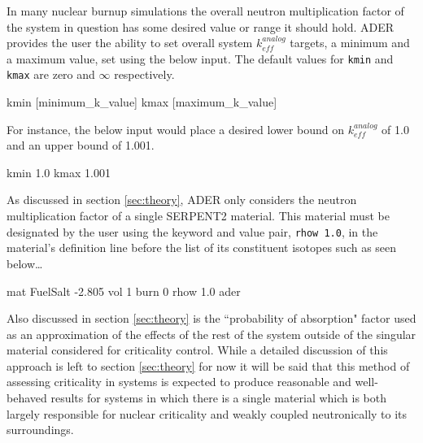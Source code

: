 In many nuclear burnup simulations the overall neutron multiplication factor
of the system in question has some desired value or range it should hold. 
ADER provides the user the ability to set overall system $k_{eff}^{analog}$
targets, a minimum and a maximum value, set using the below input. The default
values for \texttt{kmin} and \texttt{kmax} are zero and $\infty$ respectively.

\begin{lt}
kmin [minimum_k_value]
kmax [maximum_k_value]
\end{lt}

For instance, the below input would place a desired lower bound on
$k_{eff}^{analog}$ of 1.0 and an upper bound of 1.001.

\begin{li}
kmin 1.0
kmax 1.001
\end{li}

As discussed in section \ref{sec:theory}, ADER only considers the neutron
multiplication factor of a single SERPENT2 material. This material must be
designated by the user using the keyword and value pair, \texttt{rhow 1.0},
in the material's definition line before the list of its constituent isotopes
such as seen below\ldots

\begin{li}
mat FuelSalt -2.805 vol 1 burn 0 rhow 1.0 ader
\end{li}

Also discussed in section \ref{sec:theory} is the ``probability of absorption"
factor used as an approximation of the effects of the rest of the system outside
of the singular material considered for criticality control. While a detailed
discussion of this approach is left to section \ref{sec:theory} for now it 
will be said
that this method of assessing criticality in systems is expected to produce
reasonable and well-behaved results for systems in which there is a single
material which is both largely responsible for nuclear criticality and weakly
coupled neutronically to its surroundings.

